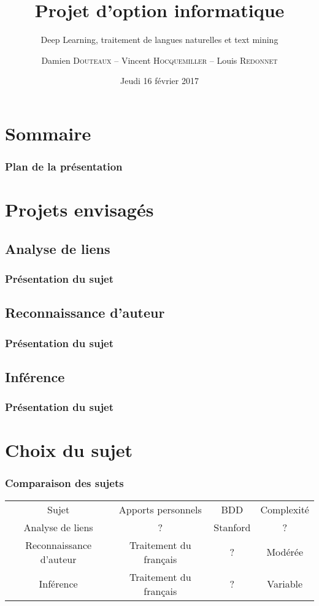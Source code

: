 \documentclass{beamer}
\title{Projet d'option informatique}
\subtitle{Deep Learning, traitement de langues naturelles et text mining}
\author{Damien \textsc{Douteaux} -- Vincent \textsc{Hocquemiller} -- Louis \textsc{Redonnet}}
\date{Jeudi 16 février 2017}
\begin{document}
\begin{frame}[plain]
	\titlepage
\end{frame}

\section{Sommaire}

\begin{frame}
	\frametitle{Plan de la présentation}
	\tableofcontents
\end{frame}

\section{Projets envisagés}

\subsection{Analyse de liens}
\begin{frame}
	\frametitle{Présentation du sujet}
	
\end{frame}

\subsection{Reconnaissance d'auteur}
\begin{frame}
	\frametitle{Présentation du sujet}
	
\end{frame}

\subsection{Inférence}
\begin{frame}
	\frametitle{Présentation du sujet}

\end{frame}

\section{Choix du sujet}

\begin{frame}
	\frametitle{Comparaison des sujets}
	\begin{table}[ht]
		\centering
		\begin{tabular}{cccc}
			Sujet & Apports personnels & BDD & Complexité \\
			Analyse de liens & ? & Stanford & ? \\
			Reconnaissance d'auteur & Traitement du français & ? & Modérée \\
			Inférence & Traitement du français & ? & Variable \\ 
		\end{tabular}
	\end{table}
\end{frame}
\end{document}
